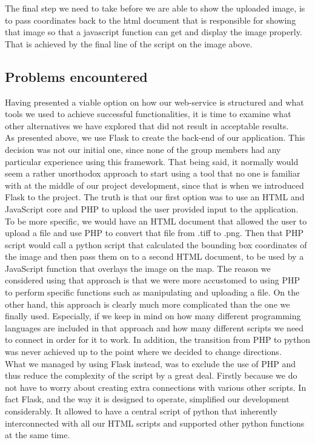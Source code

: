 The final step we need to take before we are able to show the uploaded image, is to pass coordinates back to the html document that is responsible for showing that image so that a javascript function can get and display the image properly. That is achieved by the final line of the script on the image above.

\subsection{Problems encountered}
Having presented a viable option on how our web-service is structured and what tools we used to achieve successful functionalities, it is time to examine what other alternatives we have explored that did not result in acceptable results.\\
As presented above, we use Flask to create the back-end of our application. This decision was not our initial one, since none of the group members  had any particular experience using this framework. That being said, it normally would seem a rather unorthodox approach to start using a tool that no one is familiar with at the middle of our project development, since that is when we introduced Flask to the project. The truth is that our first option was to use an HTML and JavaScript core and PHP to upload the user provided input to the application. To be more specific, we would have an HTML document that allowed the user to upload a file and use PHP to convert that file from .tiff to .png. Then that PHP script would call a python script that calculated the bounding box coordinates of the image and then pass them on to a second HTML document, to be used by a JavaScript function that overlays the image on the map. The reason we considered using that approach is that we were more accustomed to using PHP to perform specific functions such as manipulating and uploading a file. On the other hand, this approach is clearly much more complicated than the one we finally used. Especially, if we keep in mind on how many different programming languages are included in that approach and how many different scripts we need to connect in order for it to work.  In addition, the transition from PHP to python was never achieved up to the point where we decided to change directions.\\

What we managed by using Flask instead, was to exclude the use of PHP and thus reduce the complexity of the script by a great deal. Firstly because we do not have to worry about creating extra connections with various other scripts. In fact Flask, and the way it is designed to operate, simplified our development considerably. It allowed to have a central script of python that inherently interconnected with all our HTML scripts and supported other python functions at the same time.

